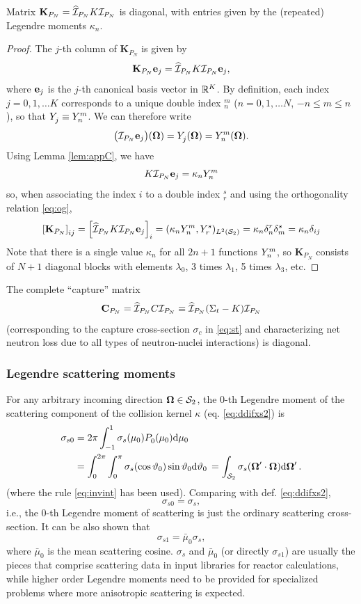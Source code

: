 \begin{corollary}
	Matrix $\mathbf{K}_{P_N} = \PihPN K \PiPN$ is diagonal, with entries given by the (repeated) Legendre moments $\kappa_n$.
\end{corollary}
\begin{proof}
	The $j$-th column of $\mathbf{K}_{P_N}$ is given by
	$$
		\mathbf{K}_{P_N}\mat{e}_j = \PihPN K \PiPN \mat{e}_j,
	$$
	where $\mat{e}_j$ is the $j$-th canonical basis vector in $\R[K]$. By definition, each index \mbox{$j = 0,1,\ldots K$}
	corresponds to a unique double index ${}_n^m$ ($n = 0,1,\ldots N$, \linebreak$-n \leq m \leq n$), so that $\Y{j}{}
	\equiv \Y{n}{m}$.
	We can therefore write 
	$$
		\bigl(\PiPN \mat{e}_j\bigr)(\bomega) = \Y{j}{}(\bomega) = Y_n^m(\bomega).
	$$
	Using Lemma \ref{lem:appC}, we have 
	$$
		K \PiPN \mat{e}_j = \kappa_n \Y{n}{m}
	$$
	so, when associating the index $i$ to a double index ${}_r^s$ and using the orthogonality relation \eqref{eq:og},
	$$
	\left[\mathbf{K}_{P_N}\right]_{ij} = \left[\PihPN K \PiPN \mat{e}_j\right]_i = (\kappa_n \Y{n}{m},
		\Y{r}{s})_{\Lp[2](\Sphere)} = \kappa_n\delta_{n}^{r}\delta_{m}^{s} = \kappa_n\kron{i}{j}
	$$
	Note that there is a single value $\kappa_n$ for all $2n + 1$ functions  $\Y{n}{m}$, so $\mathbf{K}_{P_N}$ consists of
	$N+1$ diagonal blocks with elements  $\lambda_0$, 3 times $\lambda_1$, 5 times $\lambda_3$, etc.
\end{proof}
\begin{corollary}\label{cor:capture}
The complete ``capture'' matrix 
$$
	\mat{C}_{P_N} = \PihPN C \PiPN \equiv \PihPN (\Sigma_t - K) \PiPN 
$$
(corresponding to the capture cross-section $\sigma_c$ in \eqref{eq:st} and characterizing net neutron loss due to
all types of neutron-nuclei interactions) is diagonal.
\end{corollary}

\subsubsection{Legendre scattering moments}\label{rem:app:c}
For any arbitrary incoming direction $\bomega\in\Sphere$, the $0$-th Legendre moment of
the scattering component of the collision kernel $\kappa$ (eq. \eqref{eq:ddifxs2}) is
$$
	\begin{aligned}
		\sigma_{s0} &= 2\pi \muint[_0]{\sigma_s(\mu_0)\P{0}{}(\mu_0)}\\
		& = \int_{0}^{2\pi} \int_{0}^{\pi}
		\sigma_s(\cos \polar_0) \sin \polar_0\d{\polar_0} = 
		\int_{\Sphere} \sigma_s(\bomega'\cdot\bomega) \d{\bomega'}.
\end{aligned}
$$
(where the rule \eqref{eq:invint} has been used). Comparing with def. \eqref{eq:ddifxs2}, 
$$
	\sigma_{s0} = \sigma_s,
$$
i.e., the $0$-th Legendre moment of scattering is just the ordinary scattering cross-section. It can be also shown that 
$$
	\sigma_{s1} = \bar\mu_0\sigma_s,
$$
where $\bar\mu_0$ is the mean scattering cosine. $\sigma_s$ and $\bar{\mu}_0$ (or directly $\sigma_{s1}$) are usually
the pieces that comprise scattering data in input libraries for reactor calculations, while higher order Legendre
moments need to be provided for specialized problems where more anisotropic scattering is expected. 

